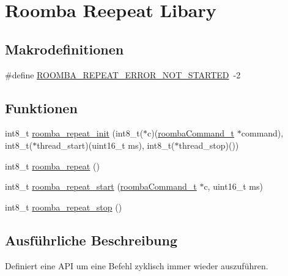 \hypertarget{group__roomba__repeat}{\section{Roomba Reepeat Libary}
\label{group__roomba__repeat}
}
\subsection*{Makrodefinitionen}
\begin{DoxyCompactItemize}
\item 
\#define \hyperlink{group__roomba__repeat_ga593e2bc405b06ccf25ab222f0c941021}{R\-O\-O\-M\-B\-A\-\_\-\-R\-E\-P\-E\-A\-T\-\_\-\-E\-R\-R\-O\-R\-\_\-\-N\-O\-T\-\_\-\-S\-T\-A\-R\-T\-E\-D}~-\/2
\end{DoxyCompactItemize}
\subsection*{Funktionen}
\begin{DoxyCompactItemize}
\item 
int8\-\_\-t \hyperlink{group__roomba__repeat_gad81fb47fd04ea70475afcdcc20c3786c}{roomba\-\_\-repeat\-\_\-init} (int8\-\_\-t($\ast$c)(\hyperlink{group__roomba__def_gae2455d95f239542954d232e31bb04a0e}{roomba\-Command\-\_\-t} $\ast$command), int8\-\_\-t($\ast$thread\-\_\-start)(uint16\-\_\-t ms), int8\-\_\-t($\ast$thread\-\_\-stop)())
\item 
int8\-\_\-t \hyperlink{group__roomba__repeat_ga2bd56d84a9ec448855282eed46119811}{roomba\-\_\-repeat} ()
\item 
int8\-\_\-t \hyperlink{group__roomba__repeat_ga021c2d6d050550c5d2c2acac164c7628}{roomba\-\_\-repeat\-\_\-start} (\hyperlink{group__roomba__def_gae2455d95f239542954d232e31bb04a0e}{roomba\-Command\-\_\-t} $\ast$c, uint16\-\_\-t ms)
\item 
int8\-\_\-t \hyperlink{group__roomba__repeat_ga6d61acb2fa3e5cad4b071254ca75a3d1}{roomba\-\_\-repeat\-\_\-stop} ()
\end{DoxyCompactItemize}


\subsection{Ausführliche Beschreibung}
Definiert eine A\-P\-I um eine Befehl zyklisch immer wieder auszuführen. 

